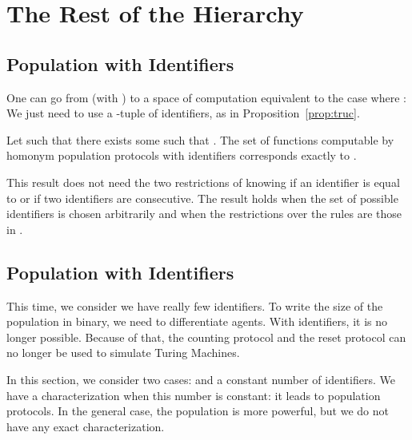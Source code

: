 \documentclass[UKenglish]{llncs}
\begin{document}
\section{The Rest of the Hierarchy}\label{resthirera}

\subsection{Population with  Identifiers}

One can go from   (with ) to a space of
computation equivalent to the case where :  We just need to use a -tuple of identifiers,
as in Proposition~\ref{prop:truc}.





\begin{theorem}\label{th:sqrt}
Let  such that there exists some  such that .
The set of functions computable by homonym population protocols with 
identifiers corresponds exactly to .
\end{theorem}





\begin{remark}
This result does not need the two restrictions of knowing if an identifier is equal to  or if
two identifiers are consecutive. The result holds when the set of possible identifiers
 is chosen arbitrarily and when the
restrictions over the rules are those in \cite{guerraoui2009names}.
\end{remark}

\subsection{Population with  Identifiers}

This time, we consider we have really few identifiers.
To write the size of the population in binary, we need to differentiate
 agents. With  identifiers, it is no longer possible.
Because of that, the counting protocol and the reset protocol can no longer
be used to simulate Turing Machines.

In this section, we consider two cases:  and
a constant number of identifiers.
We have a characterization when
this number is constant: it leads to population protocols. In the general case,
the population is more powerful, but we do not have any exact characterization.
\end{document}
